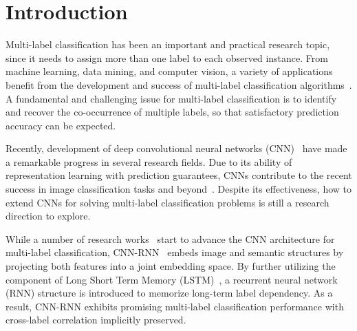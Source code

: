 \documentclass[letterpaper]{article} %
\begin{document}
\section{Introduction}
\label{sec:intro}

Multi-label classification has been an important and practical research topic, since it needs to assign more than one label to each observed instance. From machine learning, data mining, and computer vision, a variety of applications benefit from the development and success of multi-label classification algorithms~\cite{zhang2014review,boutell2004learning,schapire2000boostexter,godbole2004discriminative,lin2014microsoft,kang2016object,kang2016t,boutell2004learning,shao2016slicing}. A fundamental and challenging issue for multi-label classification is to identify and recover the co-occurrence of multiple labels, so that satisfactory prediction accuracy can be expected.


Recently, development of deep convolutional neural networks (CNN)~\cite{krizhevsky2012imagenet,szegedy2015going,simonyan2014very,he2016deep} have made a remarkable progress in several research fields. Due to its ability of representation learning with prediction guarantees, CNNs contribute to the recent success in image classification tasks and beyond~\cite{deng2009imagenet,fei2007learning,griffin2007caltech}.
Despite its effectiveness, how to extend CNNs for solving multi-label classification problems is still a research direction to explore.

While a number of research works~\cite{zhang2006multilabel,nam2014large,gong2013deep,wei2014cnn,wang2016cnn} start to advance the CNN architecture for multi-label classification, CNN-RNN~\cite{wang2016cnn} embeds image and semantic structures by projecting both features into a joint embedding space. By further utilizing the component of Long Short Term Memory (LSTM)~\cite{hochreiter1997long}, a recurrent neural network (RNN) structure is introduced to memorize long-term label dependency. As a result, CNN-RNN exhibits promising multi-label classification performance with cross-label correlation implicitly preserved.

\end{document}
